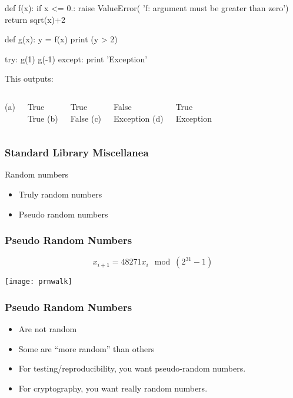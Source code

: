 \begin{frame}[fragile]

\begin{python}
def f(x):
    if x <= 0.:
        raise ValueError(
            'f: argument must be greater than zero')
    return sqrt(x)+2

def g(x):
    y = f(x)
    print (y > 2) 

try:
    g(1)
    g(-1)
except:
    print 'Exception'
\end{python}

This outputs:

\begin{columns}
(a)\par
True\\True
{}
(b)\par
True\\False
{}
(c)\par
False\\Exception
{}
(d)\par
True\\Exception
\end{columns}

\end{frame}

\begin{frame}[fragile]
\frametitle{Standard Library Miscellanea}
Random numbers
\begin{itemize}
\item Truly random numbers
\item Pseudo random numbers
\end{itemize}
\end{frame}

\begin{frame}[fragile]
\frametitle{Pseudo Random Numbers}

\[
x_{i+1} = 48271 x_i \mod (2^{31}-1)
\]

\centering
\texttt{[image: prnwalk]}

\end{frame}

\begin{frame}[fragile]
\frametitle{Pseudo Random Numbers}
\begin{itemize}
\item Are not random
\item Some are ``more random'' than others
\end{itemize}
\pause

\begin{itemize}
\item For testing/reproducibility, you want \alert{pseudo-}random numbers.
\item For cryptography, you want really random numbers.
\end{itemize}
\end{frame}

